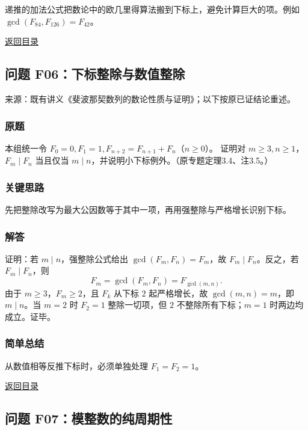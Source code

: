 \documentclass[11pt,a4paper]{article}
\begin{document}
递推的加法公式把数论中的欧几里得算法搬到下标上，避免计算巨大的项。例如
\(\gcd(F_{84},F_{126})=F_{42}\)。

\noindent\hyperref[contents]{返回目录}

\subsection{问题
F06：下标整除与数值整除}\label{ux95eeux9898-f06ux4e0bux6807ux6574ux9664ux4e0eux6570ux503cux6574ux9664}

来源：既有讲义《斐波那契数列的数论性质与证明》；以下按原已证结论重述。

\subsubsection{原题}\label{ux539fux9898-38}

本组统一令 \(F_0=0,F_1=1,F_{n+2}=F_{n+1}+F_n\)（\(n\ge0\)）。 证明对
\(m\ge3,n\ge1\)，\(F_m\mid F_n\) 当且仅当
\(m\mid n\)，并说明小下标例外。（原专题定理3.4、注3.5。）

\subsubsection{关键思路}\label{ux5173ux952eux601dux8def-38}

先把整除改写为最大公因数等于其中一项，再用强整除与严格增长识别下标。

\subsubsection{解答}\label{ux89e3ux7b54-38}

证明：若 \(m\mid n\)，强整除公式给出 \(\gcd(F_m,F_n)=F_m\)，故
\(F_m\mid F_n\)。反之，若 \(F_m\mid F_n\)，则
\[F_m=\gcd(F_m,F_n)=F_{\gcd(m,n)}.\] 由于 \(m\ge3\)，\(F_m\ge2\)，且
\(F_k\) 从下标 \(2\) 起严格增长，故 \(\gcd(m,n)=m\)，即 \(m\mid n\)。当
\(m=2\) 时 \(F_2=1\) 整除一切项，但 \(2\) 不整除所有下标；\(m=1\)
时两边均成立。证毕。

\subsubsection{简单总结}\label{ux7b80ux5355ux603bux7ed3-38}

从数值相等反推下标时，必须单独处理 \(F_1=F_2=1\)。

\noindent\hyperref[contents]{返回目录}

\subsection{问题
F07：模整数的纯周期性}\label{ux95eeux9898-f07ux6a21ux6574ux6570ux7684ux7eafux5468ux671fux6027}
\end{document}
